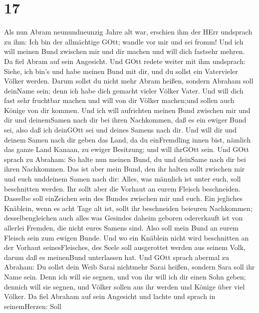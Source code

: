 \hypertarget{section-16}{%
\section{17}\label{section-16}}

 Als nun Abram neunundneunzig Jahre alt war, erschien ihm
der HErr undsprach zu ihm: Ich bin der allmächtige GOtt; wandle vor mir
und sei fromm!  Und ich will meinen Bund zwischen mir und
dir machen und will dich fastsehr mehren.  Da fiel Abram auf
sein Angesicht. Und GOtt redete weiter mit ihm undsprach: 
Siehe, ich bin's und habe meinen Bund mit dir, und du sollst ein
Vatervieler Völker werden.  Darum sollst du nicht mehr Abram
heißen, sondern Abraham soll deinName sein; denn ich habe dich gemacht
vieler Völker Vater.  Und will dich fast sehr fruchtbar
machen und will von dir Völker machen;und sollen auch Könige von dir
kommen.  Und ich will aufrichten meinen Bund zwischen mir
und dir und deinemSamen nach dir bei ihren Nachkommen, daß es ein ewiger
Bund sei, also daß ich deinGOtt sei und deines Samens nach dir.
 Und will dir und deinem Samen nach dir geben das Land, da
du einFremdling innen bist, nämlich das ganze Land Kanaan, zu ewiger
Besitzung; und will ihrGOtt sein.  Und GOtt sprach zu
Abraham: So halte nun meinen Bund, du und deinSame nach dir bei ihren
Nachkommen.  Das ist aber mein Bund, den ihr halten sollt
zwischen mir und euch unddeinem Samen nach dir: Alles, was männlich ist
unter euch, soll beschnitten werden.  Ihr sollt aber die
Vorhaut an eurem Fleisch beschneiden. Dasselbe soll einZeichen sein des
Bundes zwischen mir und euch.  Ein jegliches Knäblein, wenn
es acht Tage alt ist, sollt ihr beschneiden beieuren Nachkommen;
desselbengleichen auch alles was Gesindes daheim geboren odererkauft ist
von allerlei Fremden, die nicht eures Samens sind.  Also
soll mein Bund an eurem Fleisch sein zum ewigen Bunde.  Und
wo ein Knäblein nicht wird beschnitten an der Vorhaut seinesFleisches,
des Seele soll ausgerottet werden aus seinem Volk, darum daß es
meinenBund unterlassen hat.  Und GOtt sprach abermal zu
Abraham: Du sollst dein Weib Sarai nichtmehr Sarai heißen, sondern Sara
soll ihr Name sein.  Denn ich will sie segnen, und von ihr
will ich dir einen Sohn geben; dennich will sie segnen, und Völker
sollen aus ihr werden und Könige über viel Völker.  Da fiel
Abraham auf sein Angesicht und lachte und sprach in seinemHerzen: Soll
